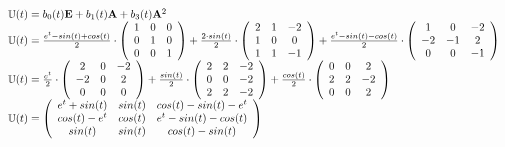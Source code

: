 \begin{equation*}
 \begin{array}{l}
  {\mathbb{U}}(t) = b_0(t){\bf E} + b_1(t){\bf A} + b_3(t){\bf A}^2\\
  {\mathbb{U}}(t) = 
    \frac{e^t - sin(t) +cos(t)}{2}\cdot
    \left(\begin{array}{ccc}
     1 & 0 & 0\\
     0 & 1 & 0\\
     0 & 0 & 1
    \end{array}\right)
    +\frac{2\cdot sin(t)}{2}\cdot
    \left(\begin{array}{ccc}
     2 & 1 & -2\\
     1 & 0 & 0\\
     1 & 1 & -1
    \end{array}\right)
    +\frac{e^t - sin(t) - cos(t)}{2}\cdot
    \left(\begin{array}{ccc}
     1 & 0 & -2\\
     -2 & -1 & 2\\
     0 & 0 & -1
    \end{array}\right)\\
  {\mathbb{U}}(t) = 
    \frac{e^t}{2}\cdot
    \left(\begin{array}{ccc}
     2 & 0 & -2\\
     -2 & 0 & 2\\
     0 & 0 & 0
    \end{array}\right)
    +\frac{sin(t)}{2}\cdot
    \left(\begin{array}{ccc}
     2 & 2 & -2\\
     0 & 0 & -2\\
     2 & 2 & -2
    \end{array}\right)
    +\frac{cos(t)}{2}\cdot
    \left(\begin{array}{ccc}
     0 & 0 & 2\\
     2 & 2 & -2\\
     0 & 0 & 2
    \end{array}\right)\\
  {\mathbb{U}}(t) = 
    \left(\begin{array}{ccc}
     e^t + sin(t) & sin(t) & cos(t) - sin(t) - e^t\\
     cos(t) - e^t & cos(t) & e^t -sin(t) - cos(t)\\
     sin(t) & sin(t) & cos(t) - sin(t)
    \end{array}\right)
 \end{array}
\end{equation*}

